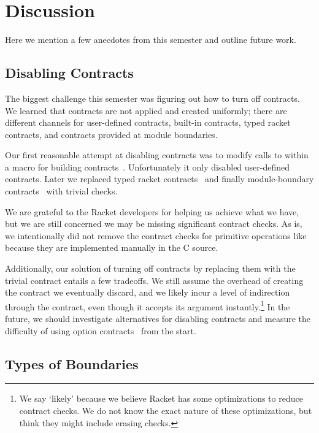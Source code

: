 \section{Discussion}
\label{discussion}

Here we mention a few anecdotes from this semester and outline future work.

\subsection{Disabling Contracts}
\label{disabling-contracts}

The biggest challenge this semester was figuring out how to turn off contracts.
We learned that contracts are not applied and created uniformly; there are different channels for user-defined contracts, built-in contracts, typed racket contracts, and contracts provided at module boundaries.

Our first reasonable attempt at disabling contracts was to modify calls to  within a macro for building contracts~\cite{no-contracts1}.
Unfortunately it only disabled user-defined contracts.
Later we replaced typed racket contracts~\cite{no-contracts2} and finally module-boundary contracts~\cite{no-contracts3} with trivial checks.

We are grateful to the Racket developers for helping us achieve what we have, but we are still concerned we may be missing significant contract checks.
As is, we intentionally did not remove the contract checks for primitive operations like \mono{+} because they are implemented manually in the C source.

Additionally, our solution of turning off contracts by replacing them with the trivial  contract entails a few tradeoffs.
We still assume the overhead of creating the contract we eventually discard, and we likely incur a level of indirection through the  contract, even though it accepts its argument instantly.\footnote{We say `likely' because we believe Racket has some optimizations to reduce contract checks. We do not know the exact nature of these optimizations, but think they might include erasing  checks.}
In the future, we should investigate alternatives for disabling contracts and measure the difficulty of using option contracts~\cite{option-contracts} from the start.

\subsection{Types of Boundaries}

